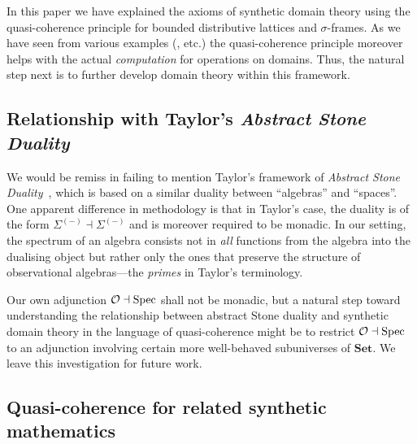 \documentclass[a4paper,12pt]{amsart}
\theoremstyle{definition}
\newcommand{\mb}[1]{\mathbf{#1}}
\newcommand{\mbb}[1]{\mathbb{#1}}
\newcommand{\I}{\mbb I}
\newcommand{\Set}{\mb{Set}}
\newcommand{\spec}{\operatorname{Spec}}
\begin{document}
In this paper we have explained the axioms of synthetic domain theory using the quasi-coherence principle for bounded distributive lattices and $\sigma$-frames. As we have seen from various examples (,  etc.) the quasi-coherence principle moreover helps with the actual \emph{computation} for operations on domains. Thus, the natural step next is to further develop domain theory within this framework.


\subsection{Relationship with Taylor's \emph{Abstract Stone Duality}}

We would be remiss in failing to mention Taylor's framework of \emph{Abstract Stone Duality}~\cite{Taylor2011,TaylorP:insema,TaylorP:sobsc}, which is based on a similar duality between ``algebras'' and ``spaces''. One apparent difference in methodology is that in Taylor's case, the duality is of the form $\Sigma^{(-)} \dashv \Sigma^{(-)}$ and is moreover required to be monadic. In our setting, the spectrum of an algebra consists not in \emph{all} functions from the algebra into the dualising object but rather only the ones that preserve the structure of observational algebras—the \emph{primes} in Taylor's terminology.

Our own adjunction $\opens\dashv\spec$ shall not be monadic, but a natural step toward understanding the relationship between abstract Stone duality and synthetic domain theory in the language of quasi-coherence might be to restrict $\opens\dashv\spec$ to an adjunction involving certain more well-behaved subuniverses of $\Set$. We leave this investigation for future work.

\subsection{Quasi-coherence for related synthetic mathematics}
\end{document}
